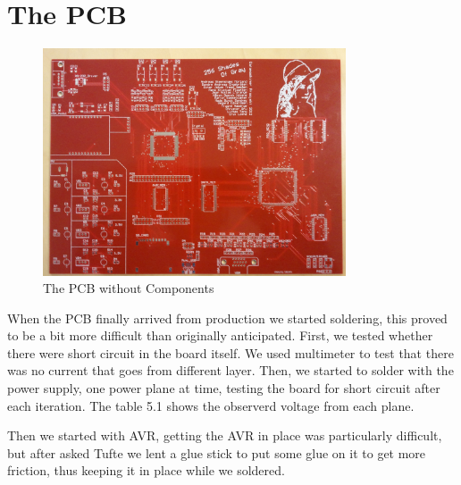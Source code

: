 \section {The PCB}
\begin{figure}[h]
  \centering
  \includegraphics[width=0.8\textwidth]{fig/pcb/pcbwithoutcomp.jpg}
  \caption{The PCB without Components}
  \label{fig:pcb}
\end{figure}
When the PCB finally arrived from production we started soldering, this proved to be a bit
more difficult than originally anticipated. First, we tested whether there were short circuit in the board itself. We used multimeter to test that there was no current that goes from different layer. Then, we started to solder with the power supply, one power plane at time, testing the board for short circuit after each iteration. The table 5.1 shows the observerd voltage from each plane. 


Then we started with AVR, getting the AVR in place was particularly difficult, but after asked Tufte we lent a glue stick to put some glue on it to get more friction, thus keeping it in place while we soldered.

